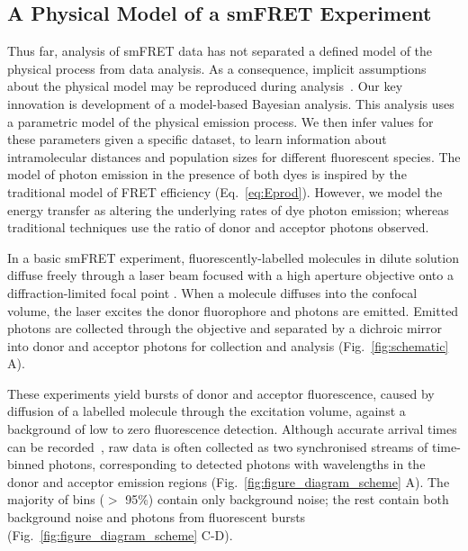 \subsection*{A Physical Model of a smFRET Experiment}
Thus far, analysis of smFRET data has not separated a defined model of the physical process from data analysis. As a consequence, implicit assumptions about the physical model may be reproduced during analysis~\cite{ying00}. Our key innovation is development of a model-based Bayesian analysis. This analysis uses a parametric model of the physical emission process. We then infer values for these parameters given a specific dataset, to learn information about intramolecular distances and population sizes for different fluorescent species. The model of photon emission in the presence of both dyes is inspired by the traditional model of FRET efficiency (Eq.~\ref{eq:Eprod}). However, we model the energy transfer as altering the underlying rates of dye photon emission; whereas traditional techniques use the ratio of donor and acceptor photons observed. 

In a basic smFRET experiment, fluorescently-labelled molecules in dilute solution diffuse freely through a laser beam focused with a high aperture objective onto a diffraction-limited focal point \cite{schuler05}.  When a molecule diffuses into the confocal volume, the laser excites the donor fluorophore and photons are emitted.  Emitted photons are collected through the objective and separated by a dichroic mirror into donor and acceptor photons for collection and analysis (Fig.~\ref{fig:schematic} A).

These experiments yield bursts of donor and acceptor fluorescence, caused by diffusion of a labelled molecule through the excitation volume, against a background of low to zero fluorescence detection.  Although accurate arrival times can be recorded~\cite{chung09}, raw data is often collected as two synchronised streams of time-binned photons, corresponding to detected photons with wavelengths in the donor and acceptor emission regions (Fig.~\ref{fig:figure_diagram_scheme} A).  The majority of bins ($>$ 95\%) contain only background noise; the rest contain both background noise and photons from fluorescent bursts (Fig.~\ref{fig:figure_diagram_scheme} C-D).


